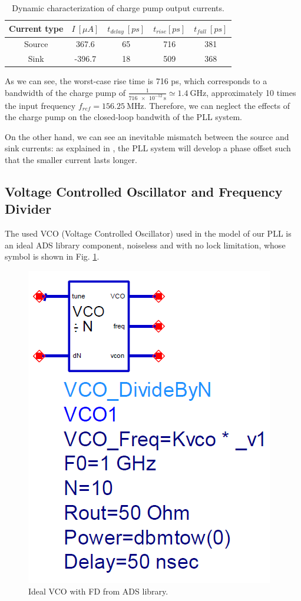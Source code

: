 \documentclass[lettersize,journal]{IEEEtran}
\begin{document}
\begin{table}[]
    \renewcommand{\arraystretch}{1.5}
    \centering
    \caption{Dynamic characterization of charge pump output currents.}
    \label{tab:cp_dynamic_values}
    \begin{tabular}{|c|c|c|c|c|}
    \hline
    Current type & $I\ [\mu A]$ & $t_{delay}\  [ps]$ & $t_{rise} [ps]$ & $t_{fall}\ [ps]$ \\ \hline
    Source                   & 367.6                     & 65                    & 716         & 381              \\ \hline
    Sink                     & -396.7                     & 18                    & 509         & 368              \\ \hline
    \end{tabular}
\end{table}

As we can see, the worst-case rise time is 716 ps, which corresponds to a bandwidth of the charge pump of \(\frac{1}{\SI{716e-12}{\second}}\simeq\SI{1.4}{\giga\hertz}\), approximately 10 times the input frequency \(f_{ref}=\SI{156.25}{\mega\hertz}\). Therefore, we can neglect the effects of the charge pump on the closed-loop bandwith of the PLL system.

On the other hand, we can see an inevitable mismatch between the source and sink currents: as explained in \cite{razavi_current_mismatch}, the PLL system will develop a phase offset such that the smaller current lasts longer.

\subsection{Voltage Controlled Oscillator and Frequency Divider}\label{sec:vco}
The used VCO (Voltage Controlled Oscillator) used in the model of our PLL is an ideal ADS library component, noiseless and with no lock limitation, whose symbol is shown in Fig. \ref{fig:vco_symbol}.

\begin{figure}[!ht]
    \centering
    \includegraphics[width=0.5\linewidth]{images/block_design/VCO/vco_symbol.png}
    \caption{Ideal VCO with FD from ADS library.}
    \label{fig:vco_symbol}
\end{figure}
\end{document}
